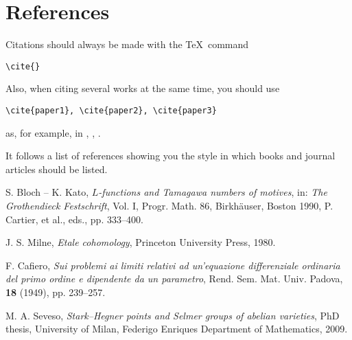 \documentclass{RSMUP}
\theoremstyle{definition}
\begin{document}
\section{References}

Citations should always be made with the \TeX\ command
\begin{verbatim}\cite{}\end{verbatim}
Also, when citing several works at the same time, you should use
\begin{verbatim}\cite{paper1}, \cite{paper2}, \cite{paper3}\end{verbatim}
as, for example, in \cite{And}, \cite{FrQu}, \cite{Jon}.

It follows a list of references showing you the style in which books and journal articles
should be listed.

\frenchspacing
\begin{thebibliography}{7}

   S. Bloch -- K. Kato,
\textit{$L$-functions and Tamagawa numbers of motives},
 in:  \textit{The Grothendieck Festschrift}, Vol. I,
 Progr. Math. 86, Birkh\"auser, Boston 1990, P. Cartier, et al., eds.,
pp. 333--400.

 J. S. Milne, \textit{Etale cohomology},
Princeton University Press, 1980.

 F. Cafiero,  \textit{Sui problemi ai limiti relativi ad un'equazione differenziale ordinaria del primo ordine e dipendente da un parametro},
Rend. Sem. Mat. Univ. Padova,    \textbf{18} (1949), pp. 239--257.


 M. A. Seveso, \textit{Stark--Hegner points and Selmer groups of abelian varieties},  PhD thesis,
University of Milan, Federigo Enriques Department of Mathematics, 2009.

\end{thebibliography}
\end{document}
